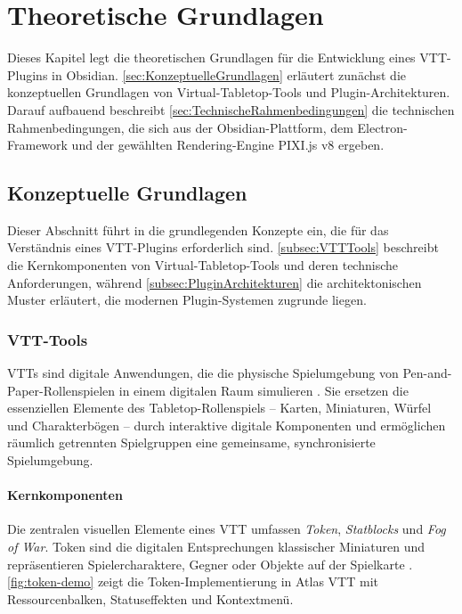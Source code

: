 \chapter{Theoretische Grundlagen}
\label{sec:GrundlagenKapitel}

Dieses Kapitel legt die theoretischen Grundlagen für die Entwicklung eines \ac{VTT}-Plugins in Obsidian. \autoref{sec:KonzeptuelleGrundlagen} erläutert zunächst die konzeptuellen Grundlagen von Virtual-Tabletop-Tools und Plugin-Architekturen. Darauf aufbauend beschreibt \autoref{sec:TechnischeRahmenbedingungen} die technischen Rahmenbedingungen, die sich aus der Obsidian-Plattform, dem Electron-Framework und der gewählten Rendering-Engine PIXI.js v8 ergeben.

\section{Konzeptuelle Grundlagen}
\label{sec:KonzeptuelleGrundlagen}

Dieser Abschnitt führt in die grundlegenden Konzepte ein, die für das Verständnis eines \ac{VTT}-Plugins erforderlich sind. \autoref{subsec:VTTTools} beschreibt die Kernkomponenten von Virtual-Tabletop-Tools und deren technische Anforderungen, während \autoref{subsec:PluginArchitekturen} die architektonischen Muster erläutert, die modernen Plugin-Systemen zugrunde liegen.

\subsection{\ac{VTT}-Tools}
\label{subsec:VTTTools}

\ac{VTT}s sind digitale Anwendungen, die die physische Spielumgebung von Pen-and-Paper-Rollenspielen in einem digitalen Raum simulieren \autocite{Roll20TokenFeatures2024}. Sie ersetzen die essenziellen Elemente des Tabletop-Rollenspiels -- Karten, Miniaturen, Würfel und Charakterbögen -- durch interaktive digitale Komponenten und ermöglichen räumlich getrennten Spielgruppen eine gemeinsame, synchronisierte Spielumgebung.

\subsubsection{Kernkomponenten}

Die zentralen visuellen Elemente eines \ac{VTT} umfassen \textit{Token}, \textit{Statblocks} und \textit{Fog of War}. Token sind die digitalen Entsprechungen klassischer Miniaturen und repräsentieren Spielercharaktere, Gegner oder Objekte auf der Spielkarte \autocite{Roll20TokenFeatures2024}. \autoref{fig:token-demo} zeigt die Token-Implementierung in Atlas \ac{VTT} mit Ressourcenbalken, Statuseffekten und Kontextmenü.

